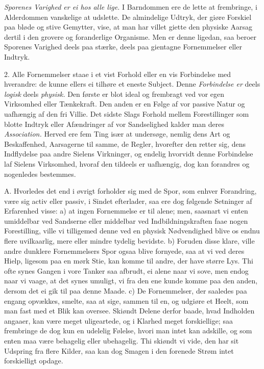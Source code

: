 \documentclass[12pt,a4paper]{article}
\newcommand{\opage}[1]{\marginnote{\footnotesize\textit{[#1]}}}
\begin{document}
\emph{Sporenes Varighed er ei hos alle lige.} I Barndommen ere de lette at frembringe, i
Alderdommen vanskelige at udslette. De almindelige Udtryk, der giøre Forskiel paa bløde
og stive Gemytter, vise, at man har villet giette den physiske Aarsag dertil i den
grovere og foranderlige Organisme. Men er denne ligedan, saa beroer Sporenes Varighed
deels paa stærke, deels paa gientagne Fornemmelser eller Indtryk.

2. Alle Fornemmelser staae i et vist Forhold eller en vis Forbindelse med hverandre: de
kunne ellers ei tilhøre et eneste Subject. Denne \emph{Forbindelse er} deels
\emph{logisk} deels \emph{physisk.} Den første er blot ideal og frembragt ved vor egen
Virksomhed eller Tænkekraft. Den anden er en Følge af vor passive Natur og uafhængig af
den fri Villie. Det sidste Slags Forhold mellem Forestillinger som blotte Indtryk eller
Afændringer af vor Sandselighed kalder man deres \emph{Association.} Herved ere fem Ting
især at undersøge, nemlig dens Art og Beskaffenhed, Aarsagerne til samme, de Regler,
hvorefter den retter sig, dens Indflydelse paa andre Sielens Virkninger, og endelig
hvorvidt denne Forbindelse laf Sielens Virksomhed, hvoraf den tildeels er uafhængig, dog
kan forandres og nogenledes bestemmes.

\opage{93} A. Hvorledes det end i øvrigt forholder sig med de Spor, som enhver Forandring, være sig
activ eller passiv, i Sindet efterlader, saa ere dog følgende Setninger af Erfarenhed
visse: a) at ingen Fornemmelse er til alene; men, saasnart vi enten umiddelbar ved
Sandserne eller middelbar ved Indbildningskraften faae nogen Forestilling, ville vi
tilligemed denne ved en physisk Nødvendighed blive os endnu flere uvilkaarlig, mere eller
mindre tydelig bevidste. b) Foruden disse klare, ville andre dunklere Fornemmelsers Spor
ogsaa blive fornyede, saa at vi ved deres Hielp, ligesom paa en mørk Stie, kan komme til
andre, der have større Lys. Thi ofte synes Gangen i vore Tanker saa afbrudt, ei alene
naar vi sove, men endog naar vi vaage, at det synes umuligt, vi fra den ene kunde komme
paa den anden, dersom det ei gik til paa denne Maade. c) De Fornemmelser, der saaledes
paa engang opvækkes, smelte, saa at sige, sammen til en, og udgiøre et Heelt, som man
fast med et Blik kan oversee. Skiøndt Delene derfor baade, hvad Indholden angaaer, kan
være meget uligeartede, og i Klarhed meget forskiellige; saa frembringe de dog kun en
udelelig Følelse, hvori man intet kan adskille, og som enten maa være behagelig eller
ubehagelig. Thi skiøndt vi vide, den har sit Udspring fra flere Kilder, saa kan dog
Smagen i den forenede Strøm intet forskielligt opdage.
\end{document}
